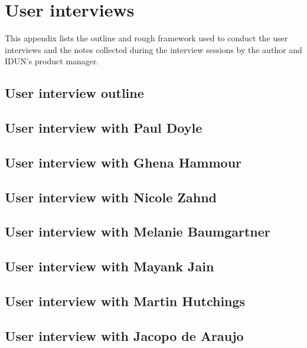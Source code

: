 \chapter{User interviews}
\label{appendix3-user-interviews}

This appendix lists the outline and rough framework used to conduct the user interviews and the notes collected during the interview sessions by the author and IDUN's product manager.

\section*{User interview outline}

\section*{User interview with Paul Doyle}

\section*{User interview with Ghena Hammour}

\section*{User interview with Nicole Zahnd}

\section*{User interview with Melanie Baumgartner}

\section*{User interview with Mayank Jain}

\section*{User interview with Martin Hutchings}

\section*{User interview with Jacopo de Araujo}

